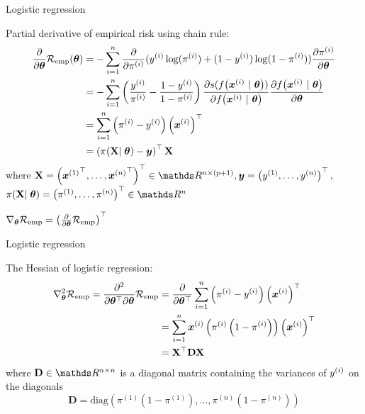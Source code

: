 \documentclass[11pt,compress,t,notes=noshow, xcolor=table]{beamer}
\begin{document}
\begin{framei}[fs=small]{Logistic regression}
\item Partial derivative of empirical risk using chain rule:
{\small
\begin{align*}
\frac{\partial}{\partial\bm{\theta}}\mathcal{R}_{\text{emp}}(\bm{\theta})
& =
-\sum\limits_{i=1}^n \frac{\partial}{\partial\pi^{(i)}}(y^{(i)}\log(\pi^{(i)})+(1-y^{(i)})\log(1-\pi^{(i)}))\frac{\partial\pi^{(i)}}{\partial \bm{\theta}} \\
& =
-\sum\limits_{i=1}^n \left(\frac{y^{(i)}}{\pi^{(i)}} -  \frac{1-y^{(i)}}{1-\pi^{(i)}}\right)\frac{\partial s(f\big(\bm{x}^{(i)} ~|~ \bm{\theta}\big))}{\partial  f\big(\bm{x}^{(i)} ~|~ \bm{\theta}\big)}\frac{\partial  f\big(\bm{x}^{(i)} ~|~ \bm{\theta}\big)}{\partial\bm{\theta}}\\
& =
\sum\limits_{i=1}^n \left(\pi^{(i)} - y^{(i)}\right)\left(\bm{x}^{(i)}\right)^\top\\
& =
\left(\pi(\mathbf{X}\vert\;\bm{\theta}) - \bm{y}\right)^\top\mathbf{X}\\
\end{align*}
}
where  $\Xmat = \left(
{\xi[1]}^{\top}, \dots,
{\xi[n]}^{\top}\right)^\top \in \R^{n\times (p+1)}, \yv = \left(
\yi[1], \dots,
\yi[n]
\right)^\top,$  $\pi(\Xmat\vert\;\thetav) = \left(
\pi^{(1)}, \dots,
\pi^{(n)}
\right)^\top \in \R^{n}$
\item $\nabla_{\bm{\theta}}\mathcal{R}_{\text{emp}} = \left(\frac{\partial}{\partial\bm{\theta}}\mathcal{R}_{\text{emp}}\right)^\top$
\end{framei}


\begin{framei}[fs=small]{Logistic regression}
\item The Hessian of logistic regression:
{\small
\begin{align*}
\nabla^2_{\bm{\theta}}\mathcal{R}_{\text{emp}}  = \frac{\partial^2}{\partial{\bm{\theta}^\top}\partial\bm{\theta}}\mathcal{R}_{\text{emp}}  & =
\frac{\partial}{\partial{\bm{\theta}^\top}} \sum\limits_{i=1}^n \left(\pi^{(i)} - y^{(i)}\right)\left(\bm{x}^{(i)}\right)^\top\\
& =
\sum\limits_{i=1}^n\bm{x}^{(i)} \left(\pi^{(i)}\left(1-\pi^{(i)}\right)\right)\left(\bm{x}^{(i)}\right)^\top\\
& =
\mathbf{X}^\top \mathbf{D} \mathbf{X}\\
\end{align*}
where $\mathbf{D} \in \R^{n\times n}$ is a diagonal matrix containing the variances of $y^{(i)}$ on the diagonals
$$\mathbf{D}=\text{diag}\left(\pi^{(1)}(1-\pi^{(1)}), \dots, \pi^{(n)}(1-\pi^{(n)})\right)$$
}
\end{framei}
\end{document}
